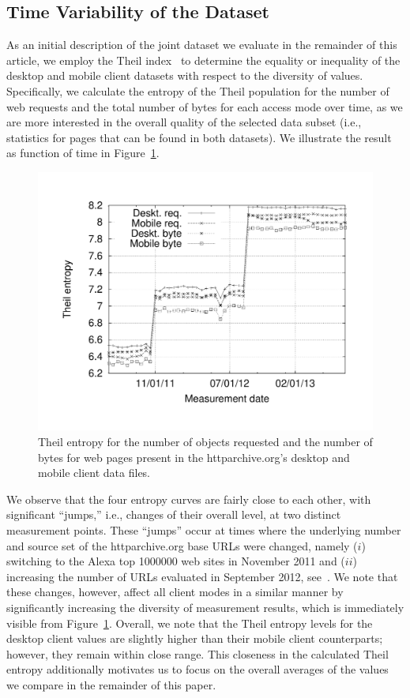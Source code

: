\documentclass[onecolumn,12pt]{IEEEtran}
\begin{document}
\subsection{Time Variability of the Dataset}
As an initial description of the joint dataset we evaluate in the remainder of this article, we employ the Theil index~\cite{Th72} to determine the equality or inequality of the desktop and mobile client datasets with respect to the diversity of values.
Specifically, we calculate the entropy of the Theil population for the number of web requests and the total number of bytes for each access mode over time, as we are more interested in the overall quality of the selected data subset (i.e., statistics for pages that can be found in both datasets).
We illustrate the result as function of time in Figure~\ref{fig:theil}.
\begin{figure}
	\centering
	\includegraphics[width=.95\linewidth]{theil}
	\caption{Theil entropy for the number of objects requested and the number of bytes for web pages present in the httparchive.org's desktop and mobile client data files.}
	\label{fig:theil}
\end{figure}
We observe that the four entropy curves are fairly close to each other, with significant ``jumps,'' i.e., changes of their overall level, at two distinct measurement points. 
These ``jumps'' occur at times where the underlying number and source set of the httparchive.org base URLs were changed, namely ($i$) switching to the Alexa top 1000000 web sites in November 2011 and ($ii$) increasing the number of URLs evaluated in September 2012, see~\cite{ht13}.
We note that these changes, however, affect all client modes in a similar manner by significantly increasing the diversity of measurement results, which is immediately visible from Figure~\ref{fig:theil}.
Overall, we note that the Theil entropy levels for the desktop client values are slightly higher than their mobile client counterparts; however, they remain within close range.
This closeness in the calculated Theil entropy additionally motivates us to focus on the overall averages of the values we compare in the remainder of this paper.
\end{document}
